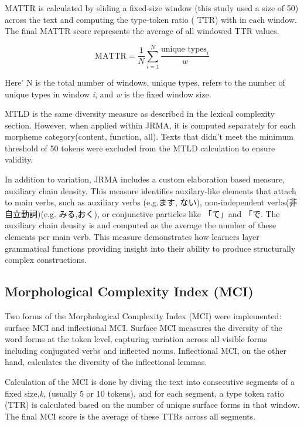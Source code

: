 MATTR is calculated by sliding a fixed-size window (this study used a size of 50) across the text and computing the
type-token ratio (
TTR) with in each window. The final MATTR score represents the average of all windowed TTR values.

\begin{equation}
    \text{MATTR} = \frac{1}{N} \sum_{i=1}^{N} \frac{\text{unique types}_i}{w}
\end{equation}

Here' N is the total number of windows, unique types, refers to the number of unique types in window \textit{i}, and
\textit{w} is
the
fixed window size.

MTLD is the same diversity measure as described in the lexical complexity section. However, when applied within
JRMA, it is computed separately for each morpheme category(content, function, all). Texts that didn't meet the
minimum threshold of 50 tokens were excluded from the MTLD calculation to ensure validity.

In addition to variation, JRMA includes a custom elaboration based measure, auxiliary chain density. This measure identifies auxilary-like elements that attach to main verbs, such as
auxiliary verbs (e.g.ます, ない), non-independent verbs(非自立動詞)(e.g. みる,おく), or conjunctive particles like 「て」and 「で. The
auxiliary chain density is and
computed as the
average the
number of these elements per main verb. This measure demonstrates how learners layer grammatical functions providing insight into their ability to produce structurally complex constructions.

\subsection{Morphological Complexity Index (MCI)}

Two forms of the Morphological Complexity Index (MCI) were implemented:
surface
MCI and
inflectional MCI. Surface MCI measures the diversity of the word forms at the token level, capturing variation
across all visible forms including conjugated verbs and inflected nouns. Inflectional MCI, on the other hand,
calculates the diversity of
the inflectional lemmas.

Calculation of the MCI is done by diving the text into consecutive segments of a fixed size,\textit{k}, (usually 5
or 10
tokens), and for each segment, a type token ratio (TTR) is calculated based on the number of unique surface forms in
that window. The final MCI score is the average of these TTRs across all segments.

